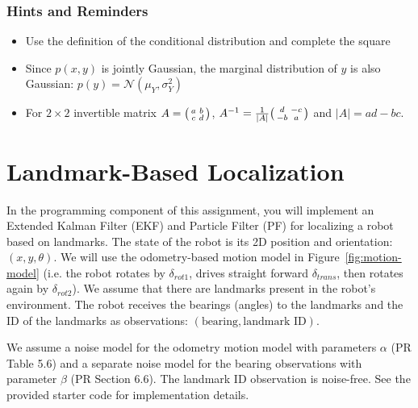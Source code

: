 \documentclass{article}
\newcommand{\?}{\stackrel{?}{=}}
\begin{document}
\subsubsection*{Hints and Reminders}
\begin{itemize}
\item Use the definition of the conditional distribution and complete the square
\item Since $p(x, y)$ is jointly Gaussian, the marginal distribution of $y$ is
  also Gaussian: $p(y) = \mathcal{N}(\mu_{Y}, \sigma_{Y}^2)$
\item For $2 \times 2$ invertible matrix
  $A = \begin{psmallmatrix} a & b \\ c & d \end{psmallmatrix}$,
  $A^{-1} = \frac{1}{|A|} \begin{psmallmatrix} d & -c \\ -b &
    a \end{psmallmatrix}$ and $|A| = ad - bc$.
\end{itemize}


\section*{Landmark-Based Localization}

%

In the programming component of this assignment, you will implement an Extended Kalman Filter (EKF) and Particle Filter (PF) for localizing a robot based on landmarks.
The state of the robot is its 2D position and orientation: $(x, y, \theta)$.
We will use the odometry-based motion model in Figure~\ref{fig:motion-model}
(i.e. the robot rotates by $\delta_{rot1}$, drives straight forward $\delta_{trans}$, then rotates again by $\delta_{rot2}$).
We assume that there are landmarks present in the robot's environment.
The robot receives the bearings (angles) to the landmarks and the ID of the landmarks as observations: $(\text{bearing}, \text{landmark ID})$.

We assume a noise model for the odometry motion model with parameters $\alpha$ (PR Table 5.6) and a separate noise model for the bearing observations with parameter $\beta$ (PR Section 6.6).
The landmark ID observation is noise-free.
See the provided starter code for implementation details.
\end{document}

